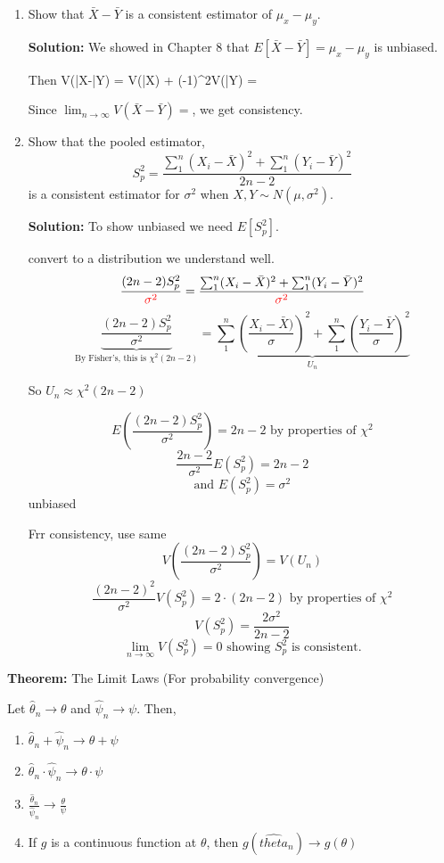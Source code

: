\documentclass[12pt]{article}
\newcommand{\E}[1]{E\left( {#1} \right)}
\newcommand{\xbar}{\bar{X}}
\newcommand{\ybar}{\bar{Y}}
\newcommand{\limn}{\lim_{n\to\infty}}
\newcommand{\nl}{\vspace{0.1in}\noindent}
\begin{document}
\begin{enumerate}[label=\textbf{\alph*}.) ]
	\item
		Show that $\xbar - \ybar$ is a consistent estimator of $\mu_x - \mu_y$.
		
		\nl \textbf{Solution:} We showed in Chapter 8 that $E[\xbar - \ybar] = \mu_x - \mu_y$ is unbiased.

		\nl Then V(\xbar -\ybar) = V(\xbar) + (-1)^2V(\ybar) = 

		\nl Since $\limn V(\xbar - \ybar) = $, we get consistency. 

	\item
		Show that the pooled estimator,
		$$S^2_p = \frac{\sum_1^n (X_i - \xbar)^2 + \sum_1^n(Y_i - \ybar)^2}{2n-2}$$
		is a consistent estimator for $\sigma^2$ when $X, Y \sim N(\mu, \sigma^2)$.

		\nl \textbf{Solution:} To show unbiased we need $E[S_p^2]$.

		\nl {} convert to a distribution we understand well.
		$$\frac{(2n-2)S_p^2}{\color{red}\sigma^2\color{black}} = \frac{\sum_1^n (X_i - \xbar)^2 + \sum_1^n(Y_i - \ybar)^2}{\color{red}\sigma^2\color{black}}$$
		$$\underbrace{\frac{(2n-2)S_p^2}{\sigma^2}}_{\text{By Fisher's, this is } \chi^2(2n-2)} = \underbrace{\sum_1^n (\frac{X_i - \xbar)}{\sigma})^2 + \sum_1^n(\frac{Y_i - \ybar}{\sigma})^2}_{U_n}$$
		
		\nl So $U_n \approx \chi^2(2n-2)$

		$$\E{\frac{(2n-2)S_p^2}{\sigma^2}} = 2n-2 \text{ by properties of } \chi^2$$
		$$\frac{2n-2}{\sigma^2} E(S_p^2) = 2n-2$$
		$$\text{and } E(S_p^2) = \sigma^2$$ unbiased

		\nl Frr consistency, use same 
		$$V(\frac{(2n-2)S_p^2}{\sigma^2}) = V(U_n)$$
		$$\frac{(2n-2)^2}{\sigma^2} V(S_p^2) = 2\cdot(2n-2)\text{ by properties of } \chi^2$$
		$$V(S_p^2) = \frac{2\sigma^2}{2n-2}$$
		$$\limn V(S_p^2) = 0 \text{ showing } S_p^2 \text{ is consistent.}$$
\end{enumerate}

\nl \textbf{Theorem:} The Limit Laws (For probability convergence)

\nl Let $\hat{\theta}_n \to \theta$ and $\hat{\psi}_n \to \psi$. Then,
\begin{enumerate}
\item $\hat{\theta}_n + \hat{\psi}_n \to \theta + \psi$
\item $\hat{\theta}_n \cdot \hat{\psi}_n \to \theta \cdot \psi$
\item $\frac{\hat{\theta}_n}{\hat{\psi}_n} \to \frac{\theta}{\psi}$
\item If $g$ is a continuous function at $\theta$, then $g(\hat{theta}_n) \to g(\theta)$
\end{enumerate}
\end{document}
